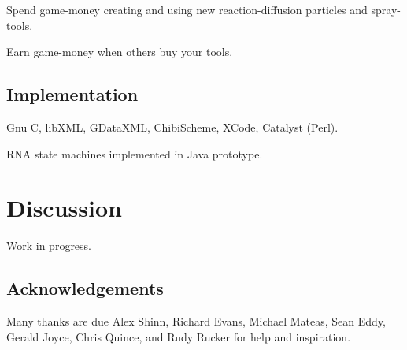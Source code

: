 \documentclass{acm_proc_article-sp}
\begin{document}
Spend game-money creating and using new reaction-diffusion particles and spray-tools.

Earn game-money when others buy your tools.

\subsection{Implementation}

Gnu C, libXML, GDataXML, ChibiScheme, XCode, Catalyst (Perl).

RNA state machines implemented in Java prototype.

\section{Discussion}

Work in progress.

\subsection{Acknowledgements}

Many thanks are due Alex Shinn, Richard Evans, Michael Mateas, Sean Eddy, Gerald Joyce, Chris Quince,
and Rudy Rucker for help and inspiration.




\balancecolumns
\end{document}
